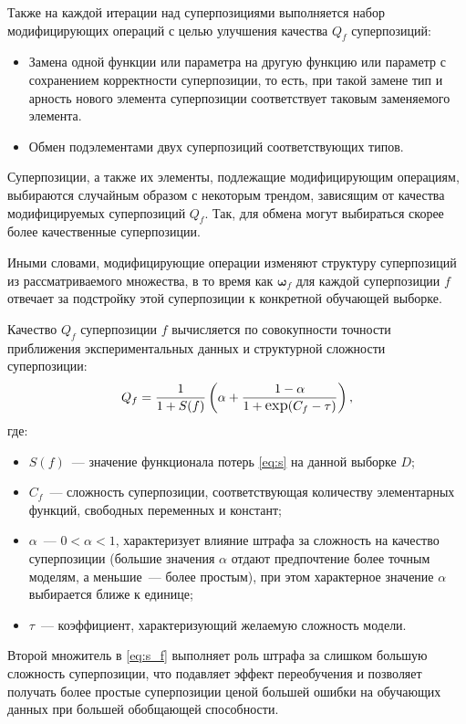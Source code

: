 \documentclass[11pt,a4paper]{article}
\theoremstyle{definition}
\begin{document}
Также на каждой итерации над суперпозициями выполняется набор модифицирующих
операций с целью улучшения качества $Q_f$ суперпозиций:
\begin{itemize}
  \item Замена одной функции или параметра на другую функцию или параметр с сохранением
	корректности суперпозиции, то есть, при такой замене тип и арность нового элемента
	суперпозиции соответствует таковым заменяемого элемента.
  \item Обмен подэлементами двух суперпозиций соответствующих типов.
\end{itemize}
Суперпозиции, а также их элементы, подлежащие модифицирующим операциям, выбираются
случайным образом с некоторым трендом, зависящим от качества модифицируемых
суперпозиций $Q_f$. Так, для обмена могут выбираться скорее более качественные
суперпозиции.

Иными словами, модифицирующие операции изменяют структуру суперпозиций из
рассматриваемого множества, в то время как $\boldsymbol{\omega}_f$ для каждой суперпозиции $f$
отвечает за подстройку этой суперпозиции к конкретной обучающей выборке.

Качество $Q_f$ суперпозиции $f$ вычисляется по совокупности точности приближения
экспериментальных данных и структурной сложности суперпозиции:
\begin{equation}
  \large
  Q_f = \frac{1}{1 + S(f)} \left(\alpha + \frac{1 - \alpha}{1 + \text{exp} (C_f - \tau)}\right),
  \label{eq:s_f}
\end{equation}
где:
\begin{itemize}
  \item[] $S(f)$~--- значение функционала потерь \eqref{eq:s} на данной выборке $D$;
  \item[] $C_f$~--- сложность суперпозиции, соответствующая количеству элементарных
	функций, свободных переменных и констант;
  \item[] $\alpha$~--- $0 < \alpha < 1$, характеризует влияние штрафа за сложность
	на качество суперпозиции (большие значения $\alpha$ отдают предпочтение более
	точным моделям, а меньшие~--- более простым), при этом характерное значение
	$\alpha$ выбирается ближе к единице;
  \item[] $\tau$~--- коэффициент, характеризующий желаемую сложность модели.
\end{itemize}

Второй множитель в \eqref{eq:s_f} выполняет роль штрафа за слишком
большую сложность суперпозиции, что подавляет эффект переобучения и позволяет
получать более простые суперпозиции ценой большей ошибки на обучающих данных
при большей обобщающей способности.
\end{document}
